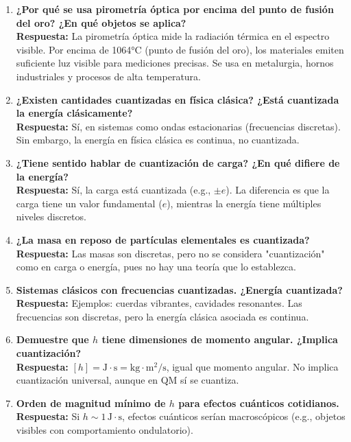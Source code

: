 \documentclass{article}
\begin{document}
\begin{enumerate}[leftmargin=*]
\item \textbf{¿Por qué se usa pirometría óptica por encima del punto de fusión del oro? ¿En qué objetos se aplica?} \\
\textbf{Respuesta:} La pirometría óptica mide la radiación térmica en el espectro visible. Por encima de 1064°C (punto de fusión del oro), los materiales emiten suficiente luz visible para mediciones precisas. Se usa en metalurgia, hornos industriales y procesos de alta temperatura.

\item \textbf{¿Existen cantidades cuantizadas en física clásica? ¿Está cuantizada la energía clásicamente?} \\
\textbf{Respuesta:} Sí, en sistemas como ondas estacionarias (frecuencias discretas). Sin embargo, la energía en física clásica es continua, no cuantizada.

\item \textbf{¿Tiene sentido hablar de cuantización de carga? ¿En qué difiere de la energía?} \\
\textbf{Respuesta:} Sí, la carga está cuantizada (e.g., \( \pm e \)). La diferencia es que la carga tiene un valor fundamental (\( e \)), mientras la energía tiene múltiples niveles discretos.

\item \textbf{¿La masa en reposo de partículas elementales es cuantizada?} \\
\textbf{Respuesta:} Las masas son discretas, pero no se considera "cuantización" como en carga o energía, pues no hay una teoría que lo establezca.

\item \textbf{Sistemas clásicos con frecuencias cuantizadas. ¿Energía cuantizada?} \\
\textbf{Respuesta:} Ejemplos: cuerdas vibrantes, cavidades resonantes. Las frecuencias son discretas, pero la energía clásica asociada es continua.

\item \textbf{Demuestre que \( h \) tiene dimensiones de momento angular. ¿Implica cuantización?} \\
\textbf{Respuesta:} \( [h] = \text{J} \cdot \text{s} = \text{kg} \cdot \text{m}^2/\text{s} \), igual que momento angular. No implica cuantización universal, aunque en QM sí se cuantiza.

\item \textbf{Orden de magnitud mínimo de \( h \) para efectos cuánticos cotidianos.} \\
\textbf{Respuesta:} Si \( h \sim 1 \, \text{J} \cdot \text{s} \), efectos cuánticos serían macroscópicos (e.g., objetos visibles con comportamiento ondulatorio).


\end{enumerate}
\end{document}
